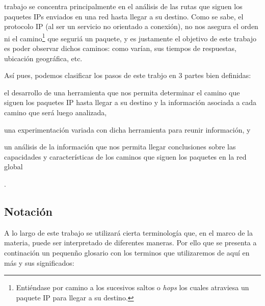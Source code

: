  trabajo se concentra principalmente en el an\'alisis
de las rutas que siguen los paquetes IPs enviados en una red hasta llegar a
su destino. Como se sabe, el protocolo IP (al ser un servicio no orientado
a conexi\'on), no nos asegura el orden ni el camino\footnote{Enti\'endase
por camino a los sucesivos saltos o \textit{hops}\cite{hop} los cuales
atraviesa un paquete IP para llegar a su destino.} que seguri\'a un paquete,
y es justamente el objetivo de este trabajo es poder observar dichos caminos:
como var\'ian, sus tiempos de respuestas, ubicaci\'on geogr\'afica, etc.

\par As\'i pues, podemos clasificar los pasos de este trabjo en 3 partes
bien definidas:
\begin{enumerate*}[label=\itshape\alph*\upshape)]
    \item el desarrollo de una herramienta que nos permita determinar el
        camino que siguen los paquetes IP hasta llegar a su destino y la
        informaci\'on asociada a cada camino que ser\'a luego analizada, 

    \item una experimentaci\'on variada con dicha herramienta para reunir
        informaci\'on, y

    \item un an\'alisis de la informaci\'on que nos permita llegar conclusiones
        sobre las capacidades y caracter\'isticas de los caminos que siguen
        los paquetes en la red global
\end{enumerate*}.


\subsection*{Notaci\'on}\label{sec:notacion}
\par A lo largo de este trabajo se utilizar\'a cierta terminolog\'ia que,
en el marco de la materia, puede ser interpretado de diferentes maneras. Por
ello que se presenta a continaci\'on un pequen\~no glosario con los
terminos que utilizaremos de aqu\'i en m\'as y sus significados:

\bigskip

